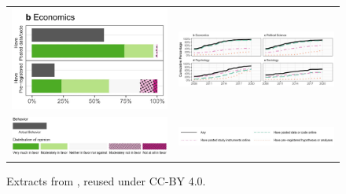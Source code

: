 \documentclass{article}
\begin{document}
\begin{figure}
    \centering
    \begin{tabular}{cc}
    \includegraphics[width=0.30\linewidth]{data/christensen-2019-fig1b.png}

    &  
    \includegraphics[width=0.65\linewidth]{data/christensen-2019-fig7.png}
    \\
    \includegraphics[width=0.25\linewidth]{data/christensen-2019-fig1-legend.png}
         &  
    \includegraphics[width=0.5\linewidth]{data/christensen-2019-fig7-legend.png}
    \\
    \end{tabular}
    \caption{Extracts from \citet[Figures 1 and 7]{ferguson_survey_2023}, reused under CC-BY 4.0.}
    \label{fig:christensen-fig1b}
\end{figure}


\end{document}

